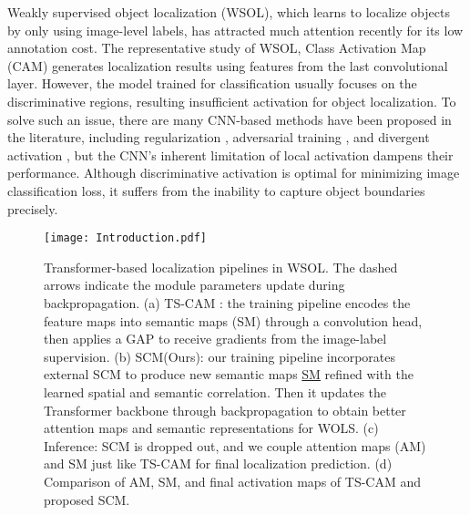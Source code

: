 \documentclass[runningheads]{llncs}
\begin{document}
Weakly supervised object localization (WSOL), which learns to localize objects by only using image-level labels, has attracted much attention recently for its low annotation cost. 
The representative study of WSOL, Class Activation Map (CAM) \cite{zhou2015cnnlocalization} generates localization results using features from the last convolutional layer. However, the model trained for classification usually focuses on the discriminative regions, resulting insufficient activation for object localization. 
To solve such an issue, there are many CNN-based methods have been proposed in the literature, including regularization \cite{DBLP:journals/corr/abs-1804-06962,Xue_2019_ICCV,Mai_2020_CVPR,Wei2022IFIA}, adversarial training \cite{DBLP:journals/corr/abs-1908-10028,Mai_2020_CVPR,DBLP:journals/corr/abs-1804-06962}, and divergent activation \cite{singh2017hideandseek,Xue_2019_ICCV,DBLP:journals/corr/abs-1905-04899}, but the CNN’s inherent limitation of local activation dampens their performance. Although discriminative activation is optimal for minimizing image classification loss, it suffers from the inability to capture object boundaries precisely.
\setlength{\textfloatsep}{5pt plus 2pt minus 2pt}
\begin{figure}[!t]
\centering
\texttt{[image: Introduction.pdf]}
\caption{Transformer-based localization pipelines in WSOL. The dashed arrows indicate the module parameters update during backpropagation.
(a) TS-CAM \cite{gao2021tscam}: the training pipeline encodes the feature maps into semantic maps (SM)  through a convolution head, then applies a GAP to receive gradients from the image-label supervision. 
(b) SCM(Ours): our training pipeline incorporates external SCM to produce new semantic maps \underline{SM} refined with the learned spatial and semantic correlation. Then it updates the Transformer backbone through backpropagation to obtain better attention maps and semantic representations for WOLS.
(c) Inference: SCM is dropped out, and we couple attention maps (AM) and SM just like TS-CAM for final localization prediction. 
(d) Comparison of AM, SM, and final activation maps of TS-CAM and proposed SCM.} 
\label{fig:introduction}
\end{figure}
\end{document}
